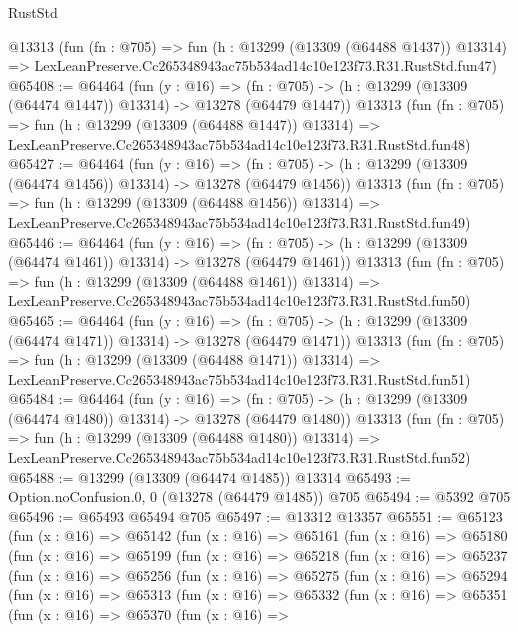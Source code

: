\begin{lexlean}{RustStd}
\begin{coremodule}
    @13313
    (fun (fn : @705) =>
    fun (h : @13299 (@13309 (@64488 @1437)) @13314) =>
    LexLeanPreserve.Cc265348943ac75b534ad14c10e123f73.R31.RustStd.fun47)
@65408 := @64464
    (fun (y : @16) =>
    (fn : @705) -> (h : @13299 (@13309 (@64474 @1447)) @13314) -> @13278 (@64479 @1447))
    @13313
    (fun (fn : @705) =>
    fun (h : @13299 (@13309 (@64488 @1447)) @13314) =>
    LexLeanPreserve.Cc265348943ac75b534ad14c10e123f73.R31.RustStd.fun48)
@65427 := @64464
    (fun (y : @16) =>
    (fn : @705) -> (h : @13299 (@13309 (@64474 @1456)) @13314) -> @13278 (@64479 @1456))
    @13313
    (fun (fn : @705) =>
    fun (h : @13299 (@13309 (@64488 @1456)) @13314) =>
    LexLeanPreserve.Cc265348943ac75b534ad14c10e123f73.R31.RustStd.fun49)
@65446 := @64464
    (fun (y : @16) =>
    (fn : @705) -> (h : @13299 (@13309 (@64474 @1461)) @13314) -> @13278 (@64479 @1461))
    @13313
    (fun (fn : @705) =>
    fun (h : @13299 (@13309 (@64488 @1461)) @13314) =>
    LexLeanPreserve.Cc265348943ac75b534ad14c10e123f73.R31.RustStd.fun50)
@65465 := @64464
    (fun (y : @16) =>
    (fn : @705) -> (h : @13299 (@13309 (@64474 @1471)) @13314) -> @13278 (@64479 @1471))
    @13313
    (fun (fn : @705) =>
    fun (h : @13299 (@13309 (@64488 @1471)) @13314) =>
    LexLeanPreserve.Cc265348943ac75b534ad14c10e123f73.R31.RustStd.fun51)
@65484 := @64464
    (fun (y : @16) =>
    (fn : @705) -> (h : @13299 (@13309 (@64474 @1480)) @13314) -> @13278 (@64479 @1480))
    @13313
    (fun (fn : @705) =>
    fun (h : @13299 (@13309 (@64488 @1480)) @13314) =>
    LexLeanPreserve.Cc265348943ac75b534ad14c10e123f73.R31.RustStd.fun52)
@65488 := @13299 (@13309 (@64474 @1485)) @13314
@65493 := Option.noConfusion.{0, 0} (@13278 (@64479 @1485)) @705
@65494 := @5392 @705
@65496 := @65493 @65494 @705
@65497 := @13312 @13357
@65551 := @65123
    (fun (x : @16) =>
    @65142
      (fun (x : @16) =>
      @65161
        (fun (x : @16) =>
        @65180
          (fun (x : @16) =>
          @65199
            (fun (x : @16) =>
            @65218
              (fun (x : @16) =>
              @65237
                (fun (x : @16) =>
                @65256
                  (fun (x : @16) =>
                  @65275
                    (fun (x : @16) =>
                    @65294
                      (fun (x : @16) =>
                      @65313
                        (fun (x : @16) =>
                        @65332
                          (fun (x : @16) =>
                          @65351
                            (fun (x : @16) =>
                            @65370
                              (fun (x : @16) =>

\end{coremodule}
\end{lexlean}
